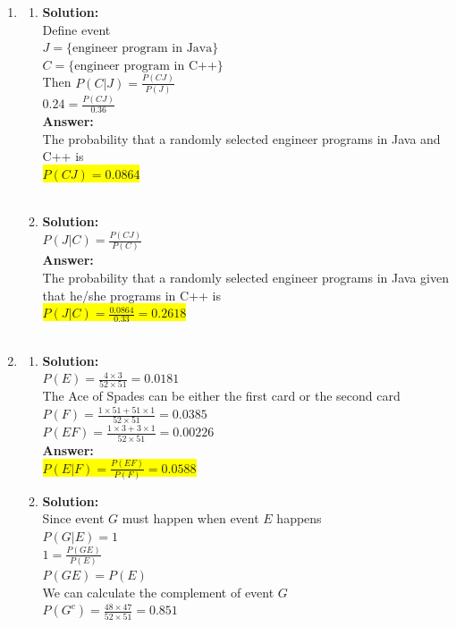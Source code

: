 \documentclass{article}
\newcommand{\myansw}{\textbf{Answer:}\\}
\newcommand{\mysolu}{\textbf{Solution:}\\}
\begin{document}
\thispagestyle{fancy} %

\begin{enumerate}
	\item
	\begin{enumerate}
		\item
		\mysolu
		Define event\\
		${J = \{\text{engineer program in Java}\}}$\\
		${C = \{\text{engineer program in C++}\}}$\\
		Then
		${P(C|J)=\frac{P(CJ)}{P(J)}}$\\
		${0.24=\frac{P(CJ)}{0.36}}$\\
		\myansw
		The probability that a randomly selected engineer programs in Java and C++ is\\
		\colorbox{yellow}{
			${P(CJ)=0.0864}$\\
		}\\
		\item
		\mysolu
		${P(J|C)=\frac{P(CJ)}{P(C)}}$\\
		\myansw
		The probability that a randomly selected engineer programs in Java given that he/she programs in C++ is\\
		\colorbox{yellow}{
			${P(J|C)=\frac{0.0864}{0.33}=0.2618}$\\
		}\\
	\end{enumerate}
	\item
	\begin{enumerate}
		\item 
		\mysolu
		${P(E)=\frac{4\times 3}{52 \times 51}=0.0181}$\\
		The Ace of Spades can be either the first card or the second card\\
		${P(F)=\frac{1\times 51 + 51 \times 1}{52 \times 51}=0.0385}$\\
		${P(EF)=\frac{1\times 3 + 3 \times 1}{52 \times 51}=0.00226}$\\
		\myansw
		\colorbox{yellow}{${P(E|F)=\frac{P(EF)}{P(F)}=0.0588}$}\\
		\item 
		\mysolu
		Since event ${G}$ must happen when event ${E}$ happens\\
		${P(G|E)=1}$\\
		${1=\frac{P(GE)}{P(E)}}$\\
		${P(GE)=P(E)}$\\
		We can calculate the complement of event ${G}$\\
		${P(G^c)=\frac{48\times 47}{52\times 51}=0.851}$\\

\end{enumerate}
\end{enumerate}
\end{document}
